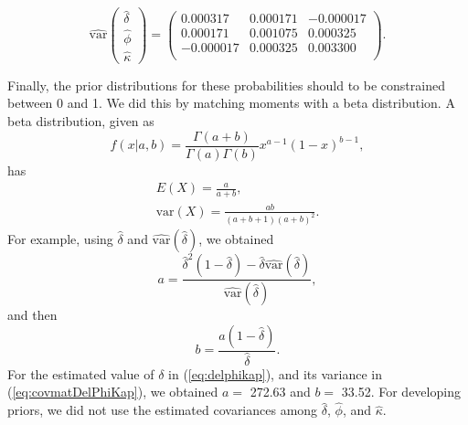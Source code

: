 \documentclass[12pt, titlepage]{article}\usepackage[]{graphicx}\usepackage[]{color}
\def\var{\textrm{var}}
\begin{document}
\begin{equation} \label{eq:covmatDelPhiKap}
  \hat{\var}\left(\begin{array}{c}
    \hat{\delta} \\
    \hat{\phi} \\
    \hat{\kappa}
  \end{array}\right) =
  \left(\begin{array}{ccc}
 0.000317 & 0.000171 & -0.000017 \\ 
  0.000171 & 0.001075 & 0.000325 \\ 
  -0.000017 & 0.000325 & 0.003300 \\ 
  
  \end{array}\right).
\end{equation}


Finally, the prior distributions for these probabilities should to be constrained between 0 and 1.  We did this by matching moments with a beta distribution.  A beta distribution, given as
\[
f(x|a,b) = \frac{\Gamma(a + b)}{\Gamma(a)\Gamma(b)}x^{a-1}(1-x)^{b-1},
\]
has 
\[
\begin{array}{c}
E(X) = \frac{a}{a + b}, \\
\var(X) = \frac{ab}{(a + b + 1)(a + b)^2}.
\end{array}
\]
For example, using $\hat{\delta}$ and $\hat{\var}(\hat{\delta})$, we obtained 
\[
a = \frac{\hat{\delta}^2(1-\hat{\delta}) - \hat{\delta}\hat{\var}(\hat{\delta})}
{\hat{\var}(\hat{\delta})},
\]
and then
\[
b = \frac{a(1 - \hat{\delta})}{\hat{\delta}}.
\]
For the estimated value of $\delta$ in (\ref{eq:delphikap}), and its variance in (\ref{eq:covmatDelPhiKap}), we obtained $a =$ 272.63 and $b =$ 33.52. For developing priors, we did not use the estimated covariances among $\hat{\delta}$, $\hat{\phi}$, and $\hat{\kappa}$.
\end{document}
